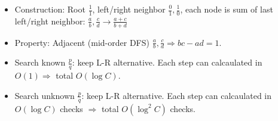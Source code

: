 \begin{itemize}
    \item Construction: Root $\frac 1 1$, left/right neighbor $\frac 0 1, \frac 1 0$, 
          each node is sum of last left/right neighbor: $\frac a b, \frac c d \rightarrow \frac{a+c}{b+d}$
    \item Property: Adjacent (mid-order DFS) $\frac a b, \frac c d \Rightarrow bc-ad = 1$.
    \item Search known $\frac p q$: keep L-R alternative. Each step can calcaulated in $O(1) \Rightarrow$ total $O(\log C)$.
    \item Search unknown $\frac p q$: keep L-R alternative. Each step can calcaulated in $O(\log C)$ checks $\Rightarrow$ total $O(\log^2 C)$ checks.
\end{itemize}
    